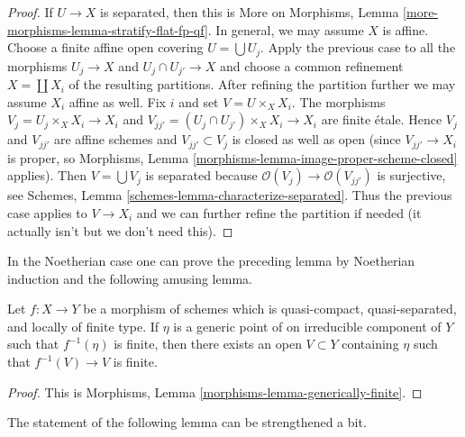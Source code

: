 \begin{proof}
If $U \to X$ is separated, then this is
More on Morphisms, Lemma \ref{more-morphisms-lemma-stratify-flat-fp-qf}.
In general, we may assume $X$ is affine. Choose a finite affine open
covering $U = \bigcup U_j$. Apply the previous case to all the morphisms
$U_j \to X$ and $U_j \cap U_{j'} \to X$ and choose a common
refinement $X = \coprod X_i$ of the resulting partitions.
After refining the partition further we may assume $X_i$ affine as well.
Fix $i$ and set $V = U \times_X X_i$. The morphisms
$V_j = U_j \times_X X_i \to X_i$ and
$V_{jj'} = (U_j \cap U_{j'}) \times_X X_i \to X_i$ are finite \'etale.
Hence $V_j$ and $V_{jj'}$ are affine schemes and $V_{jj'} \subset V_j$
is closed as well as open (since $V_{jj'} \to X_i$ is proper, so
Morphisms, Lemma \ref{morphisms-lemma-image-proper-scheme-closed}
applies). Then $V = \bigcup V_j$ is separated because
$\mathcal{O}(V_j) \to \mathcal{O}(V_{jj'})$ is surjective, see
Schemes, Lemma \ref{schemes-lemma-characterize-separated}.
Thus the previous case applies to $V \to X_i$ and we can further
refine the partition if needed (it actually isn't but we don't
need this).
\end{proof}

\noindent
In the Noetherian case one can prove the preceding lemma by
Noetherian induction and the following amusing lemma.

\begin{lemma}
\label{lemma-generically-finite}
Let $f: X \to Y$ be a morphism of schemes which is quasi-compact,
quasi-separated, and locally of finite type. If $\eta$ is a generic point
of on irreducible component of $Y$ such that $f^{-1}(\eta)$ is finite, then
there exists an open $V \subset Y$ containing $\eta$ such that
$f^{-1}(V) \to V$ is finite.
\end{lemma}

\begin{proof}
This is Morphisms, Lemma \ref{morphisms-lemma-generically-finite}.
\end{proof}

\noindent
The statement of the following lemma can be strengthened a bit.

